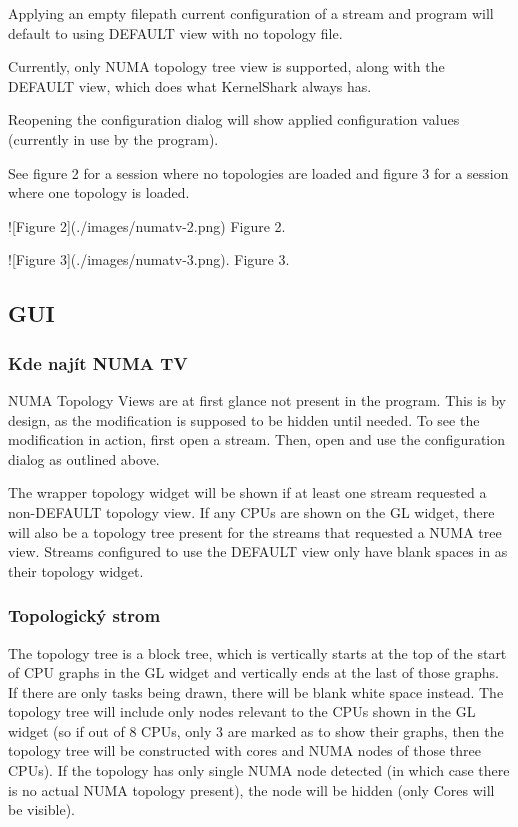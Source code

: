 \begin{code}
Applying an empty filepath current configuration of a stream and program will
default to using DEFAULT view with no topology file.

Currently, only NUMA topology tree view is supported, along with the DEFAULT view,
which does what KernelShark always has.

Reopening the configuration dialog will show applied configuration values
(currently in use by the program).

See figure 2 for a session where no topologies are loaded and figure 3 for
a session where one topology is loaded.

![Figure 2](./images/numatv-2.png)
Figure 2.

![Figure 3](./images/numatv-3.png).
Figure 3.

\subsection{GUI}

\subsubsection{Kde najít NUMA TV}

NUMA Topology Views are at first glance not present in the program. This is by
design, as the modification is supposed to be hidden until needed. To see the
modification in action, first open a stream. Then, open and use the configuration
dialog as outlined above.

The wrapper topology widget will be shown if at least one stream requested a
non-DEFAULT topology view. If any CPUs are shown on the GL widget, there will
also be a topology tree present for the streams that requested a NUMA tree view.
Streams configured to use the DEFAULT view only have blank spaces in as their
topology widget. 

\subsubsection{Topologický strom}
The topology tree is a block tree, which is vertically starts at the top of the
start of CPU graphs in the GL widget and vertically ends at the last of those
graphs. If there are only tasks being drawn, there will be blank white space
instead. The topology tree will include only nodes relevant to the CPUs shown in
the GL widget (so if out of 8 CPUs, only 3 are marked as to show their graphs,
then the topology tree will be constructed with cores and NUMA nodes of those
three CPUs). If the topology has only single NUMA node detected (in which case
there is no actual NUMA topology present), the node will be hidden (only Cores
will be visible).


\end{code}
